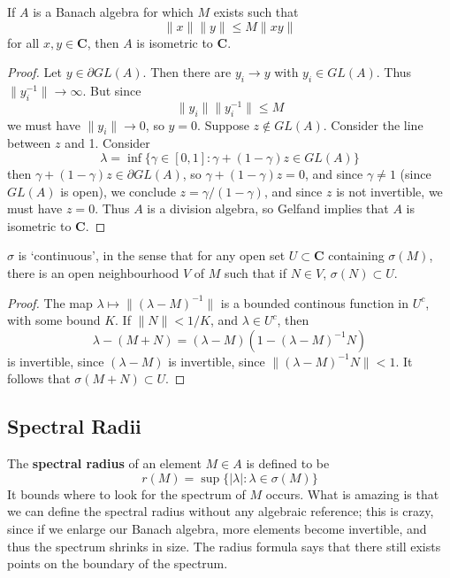 \begin{theorem}
    If $A$ is a Banach algebra for which $M$ exists such that
    \[ \| x \| \| y \| \leq M \| x y \| \]
    for all $x,y \in \mathbf{C}$, then $A$ is isometric to $\mathbf{C}$.
\end{theorem}
\begin{proof}
    Let $y \in \partial GL(A)$. Then there are $y_i \to y$ with $y_i \in GL(A)$. Thus $\| y_i^{-1} \| \to \infty$. But since
    \[ \| y_i \| \| y_i^{-1} \| \leq M \]
    we must have $\| y_i \| \to 0$, so $y = 0$. Suppose $z \not \in GL(A)$. Consider the line between $z$ and 1. Consider
    \[ \lambda = \inf \{ \gamma \in [0,1] : \gamma + (1 - \gamma) z \in GL(A) \} \]
    then $\gamma + (1 - \gamma) z \in \partial GL(A)$, so $\gamma + (1 - \gamma) z = 0$, and since $\gamma \neq 1$ (since $GL(A)$ is open), we conclude $z = \gamma/(1-\gamma)$, and since $z$ is not invertible, we must have $z = 0$. Thus $A$ is a division algebra, so Gelfand implies that $A$ is isometric to $\mathbf{C}$.
\end{proof}

\begin{theorem}
    $\sigma$ is `continuous', in the sense that for any open set $U \subset \mathbf{C}$ containing $\sigma(M)$, there is an open neighbourhood $V$ of $M$ such that if $N \in V$, $\sigma(N) \subset U$.
\end{theorem}
\begin{proof}
    The map $\lambda \mapsto \| (\lambda - M)^{-1} \|$ is a bounded continous function in $U^c$, with some bound $K$. If $\| N \| < 1/K$, and $\lambda \in U^c$, then
    \[ \lambda - (M + N) = (\lambda - M)(1 - (\lambda - M)^{-1}N) \]
    is invertible, since $(\lambda - M)$ is invertible, since $\| (\lambda - M)^{-1} N \| < 1$. It follows that $\sigma(M + N) \subset U$.
\end{proof}

\subsection{Spectral Radii}

The {\bf spectral radius} of an element $M \in A$ is defined to be
%
\[ r(M) = \sup \{ |\lambda| : \lambda \in \sigma(M) \} \]
%
It bounds where to look for the spectrum of $M$ occurs. What is amazing is that we can define the spectral radius without any algebraic reference; this is crazy, since if we enlarge our Banach algebra, more elements become invertible, and thus the spectrum shrinks in size. The radius formula says that there still exists points on the boundary of the spectrum.

